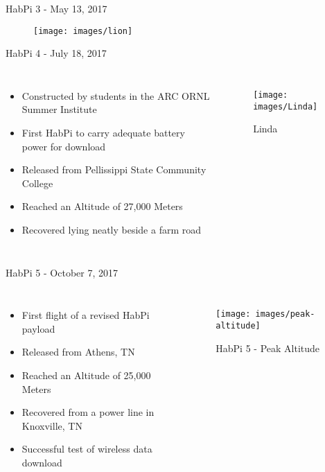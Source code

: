 \documentclass[handout]{beamer}
\begin{document}
\begin{frame}{HabPi 3 - May 13, 2017}
    \begin{figure}
        \centering
        \texttt{[image: images/lion]}
    \end{figure}
\end{frame}

\begin{frame}{HabPi 4 - July 18, 2017}
    \begin{columns}[t]
        \begin{itemize}
            \item Constructed by students in the ARC ORNL Summer Institute
	    \item First HabPi to carry adequate battery power for download
	    \item Released from Pellissippi State Community College
            \item Reached an Altitude of 27,000 Meters 
	    \item Recovered lying neatly beside a farm road
        \end{itemize}

        \begin{figure}
            \centering
            \texttt{[image: images/Linda]}
            \caption{\tiny Linda}
        \end{figure}
    \end{columns}
\end{frame}

\begin{frame}{HabPi 5 - October 7, 2017}
    \begin{columns}[t]
        \begin{itemize}
            \item First flight of a revised HabPi payload
	    \item Released from Athens, TN
            \item Reached an Altitude of 25,000 Meters 
	    \item Recovered from a power line in Knoxville, TN
	    \item Successful test of wireless data download
        \end{itemize}

        \begin{figure}
            \centering
            \texttt{[image: images/peak-altitude]}
            \caption{\tiny HabPi 5 - Peak Altitude}
        \end{figure}
    \end{columns}
\end{frame}
\end{document}
